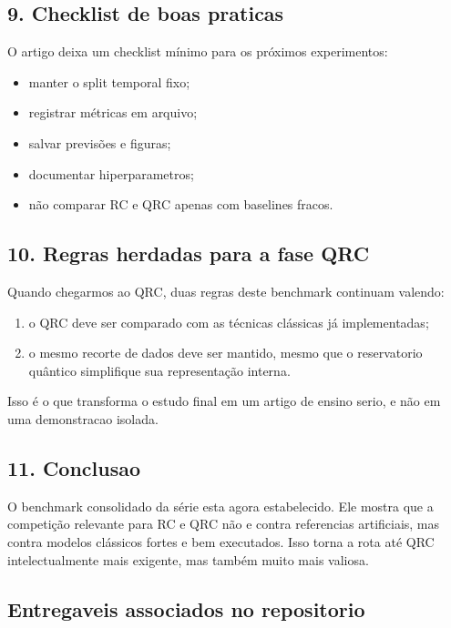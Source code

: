\documentclass[12pt]{article}
\providecommand{\tightlist}{%
          \setlength{\itemsep}{0pt}\setlength{\parskip}{0pt}}
\begin{document}
\subsection{9. Checklist de boas praticas}\label{9-checklist-de-boas-praticas}

O artigo deixa um checklist mínimo para os próximos experimentos:

\begin{itemize}
\tightlist
\item
  manter o split temporal fixo;
\item
  registrar métricas em arquivo;
\item
  salvar previsões e figuras;
\item
  documentar hiperparametros;
\item
  não comparar RC e QRC apenas com baselines fracos.
\end{itemize}

\subsection{10. Regras herdadas para a fase QRC}\label{10-regras-herdadas-para-a-fase-qrc}

Quando chegarmos ao QRC, duas regras deste benchmark continuam valendo:

\begin{enumerate}
\def\labelenumi{\arabic{enumi}.}
\tightlist
\item
  o QRC deve ser comparado com as técnicas clássicas já implementadas;
\item
  o mesmo recorte de dados deve ser mantido, mesmo que o reservatorio quântico simplifique sua representação interna.
\end{enumerate}

Isso é o que transforma o estudo final em um artigo de ensino serio, e não em uma demonstracao isolada.

\subsection{11. Conclusao}\label{11-conclusao}

O benchmark consolidado da série esta agora estabelecido. Ele mostra que a competição relevante para RC e QRC não e contra referencias artificiais, mas contra modelos clássicos fortes e bem executados. Isso torna a rota até QRC intelectualmente mais exigente, mas também muito mais valiosa.

\subsection{Entregaveis associados no repositorio}\label{entregaveis-associados-no-repositorio}
\end{document}
